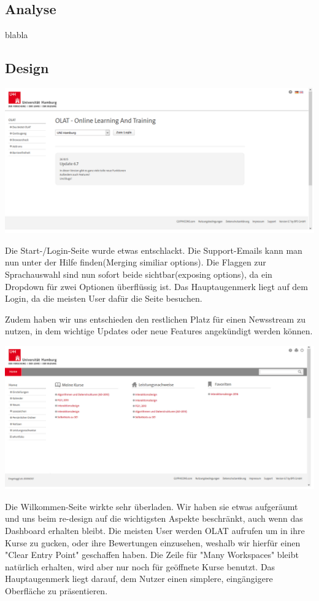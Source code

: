 ﻿\documentclass[a4paper,10pt]{article}
\begin{document}
\kopf
\renewcommand{\figurename}{Figure}


\subsection{Analyse}
blabla

\subsection{Design}
\includegraphics[scale=0.4]{images/login_seite.png}

Die Start-/Login-Seite wurde etwas entschlackt. Die Support-Emails kann man nun unter der Hilfe finden(Merging similiar options). Die Flaggen zur Sprachauswahl sind nun sofort beide sichtbar(exposing options), da ein Dropdown für zwei Optionen überflüssig ist. Das Hauptaugenmerk liegt auf dem Login, da die meisten User dafür die Seite besuchen.

Zudem haben wir uns entschieden den restlichen Platz für einen Newsstream zu nutzen, in dem wichtige Updates oder neue Features angekündigt werden können.


\includegraphics[scale=0.4]{images/wilkommen_seite.png}

Die Wilkommen-Seite wirkte sehr überladen. Wir haben sie etwas aufgeräumt und uns beim re-design auf die wichtigsten Aspekte beschränkt, auch wenn das Dashboard erhalten bleibt. Die meisten User werden OLAT aufrufen um in ihre Kurse zu gucken, oder ihre Bewertungen einzusehen, weshalb wir hierfür einen "Clear Entry Point" geschaffen haben. Die Zeile für "Many Workspaces" bleibt natürlich erhalten, wird aber nur noch für geöffnete Kurse benutzt. Das Hauptaugenmerk liegt darauf, dem Nutzer einen simplere, eingängigere Oberfläche zu präsentieren.
\end{document}
